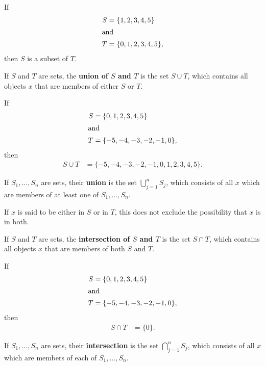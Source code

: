 \documentclass[12pt]{article}
\begin{document}
\begin{exm}
  If
  \begin{align*}
    S &= \{1,2,3,4,5\}\\
    \shortintertext{and}
    T &= \{0,1,2,3,4,5\},
  \end{align*}
  then $S$ is a subset of $T$.
\end{exm}

\begin{defn}
  If $S$ and $T$ are sets, the \textbf{union of $S$ and $T$} is the set $S \cup T$,
  which contains all objects $x$ that are members of either $S$ or $T$.

  \begin{exm}
    If
    \begin{align*}
      S &= \{0,1,2,3,4,5\}\\
      \shortintertext{and}
      T &= \{-5,-4,-3,-2,-1,0\},
    \end{align*}
    then
    \begin{align*}
      S \cup T &= \{-5,-4,-3,-2,-1,0,1,2,3,4,5\}.
    \end{align*}
  \end{exm}

  If $S_1,\ldots,S_n$ are sets, their \textbf{union} is the set $\bigcup_{j =
  1}^{n}S_j$, which consists of all $x$ which are members of at least one of
  $S_1,\ldots,S_n$.
\end{defn}

\begin{comm}
  If $x$ is said to be either in $S$ or in $T$, this does not exclude the possibility
  that $x$ is in both.
\end{comm}

\begin{defn}
  If $S$ and $T$ are sets, the \textbf{intersection of $S$ and $T$} is the set $S
  \cap T$, which contains all objects $x$ that are members of both $S$ and $T$.

  \begin{exm}
    If
    \begin{align*}
      S &= \{0,1,2,3,4,5\}\\
      \shortintertext{and}
      T &= \{-5,-4,-3,-2,-1,0\},
    \end{align*}
    then
    \begin{align*}
      S \cap T &= \{0\}.
    \end{align*}
  \end{exm}

  If $S_1,\ldots,S_n$ are sets, their \textbf{intersection} is the set $\bigcap_{j =
  1}^{n}S_j$, which consists of all $x$ which are members of each of
  $S_1,\ldots,S_n$.
\end{defn}
\end{document}
